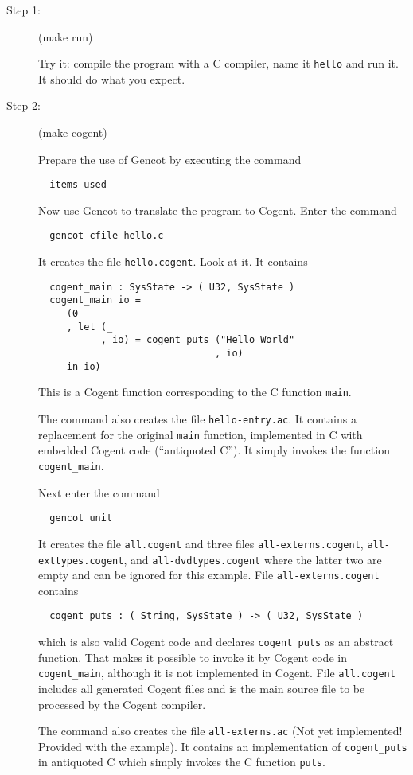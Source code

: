 \documentclass[a4paper]{report}
\newcommand{\code}[1]{\textnormal{\texttt{#1}}}
\begin{document}
\begin{description}
\item[Step 1:] (make run)

Try it: compile the program with a C compiler, name it \code{hello} and run it. It should do what you expect.

\item[Step 2:] (make cogent)

Prepare the use of Gencot by executing the command
\begin{verbatim}
  items used
\end{verbatim}

Now use Gencot to translate the program to Cogent. Enter the command
\begin{verbatim}
  gencot cfile hello.c
\end{verbatim}
It creates the file \code{hello.cogent}. Look at it. It contains
\begin{verbatim}
  cogent_main : SysState -> ( U32, SysState )
  cogent_main io =
     (0
     , let (_
           , io) = cogent_puts ("Hello World"
                               , io)
     in io)
\end{verbatim}
This is a Cogent function corresponding to the C function \code{main}.

The command also creates the file \code{hello-entry.ac}. It contains a replacement for the original \code{main}
function, implemented in C with embedded Cogent code (``antiquoted C''). It simply invokes the function
\code{cogent\_main}.

Next enter the command
\begin{verbatim}
  gencot unit
\end{verbatim}
It creates the file \code{all.cogent} and three files \code{all-externs.cogent}, \code{all-exttypes.cogent}, 
and \code{all-dvdtypes.cogent} where the latter two are empty and can be ignored for this example. File 
\code{all-externs.cogent} contains
\begin{verbatim}
  cogent_puts : ( String, SysState ) -> ( U32, SysState )
\end{verbatim}
which is also valid Cogent code and declares \code{cogent\_puts} as an abstract function. That makes it possible
to invoke it by Cogent code in \code{cogent\_main}, although it is not implemented in Cogent. File \code{all.cogent}
includes all generated Cogent files and is the main source file to be processed by the Cogent compiler.

The command also creates the file \code{all-externs.ac} (Not yet implemented! Provided with the example). It contains
an implementation of \code{cogent\_puts} in antiquoted C which simply invokes the C function \code{puts}.


\end{description}
\end{document}

